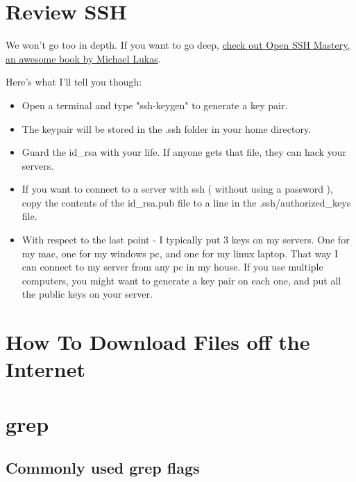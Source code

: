\documentclass[12pt,a4paper]{article}
\begin{document}
\section{Review SSH}

We won't go too in depth. If you want to go deep, \href{
https://www.tiltedwindmillpress.com/product/ssh-mastery-2nd-edition/}{check out
Open SSH Mastery, an awesome book by Michael Lukas}.

Here's what I'll tell you though:

\begin{itemize}
\item Open a terminal and type "ssh-keygen" to generate a key pair.
\item The keypair will be stored in the .ssh folder in your home directory.
\item Guard the id\_rsa with your life. If anyone gets that file, they can hack
your servers.
\item If you want to connect to a server with ssh ( without using a password ),
copy the contents of the id\_rsa.pub file to a line in the .ssh/authorized\_keys
file.
\item With respect to the last point - I typically put 3 keys on my servers. One
for my mac, one for my windows pc, and one for my linux laptop. That way I can
connect to my server from any pc in my house. If you use multiple computers, you
might want to generate a key pair on each one, and put all  the public keys on
your server.
\end{itemize}

\noindent{}







\section{How To Download Files off the Internet}


\section{grep}

\subsection{Commonly used grep flags}
\end{document}
